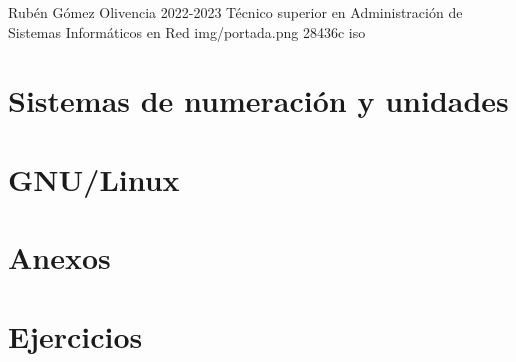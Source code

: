 \documentclass{\ClassPath/yukibook}
\begin{document}
    {Rubén Gómez Olivencia}  %
    {2022-2023}    %
    {Técnico superior en Administración de \linebreak Sistemas Informáticos en Red} %
    {}%
    {}%
    {img/portada.png} %
    {28436c}
    {iso} %

    \coverpage
    \graphicspath{{../../../yukibook.cls/}}
    \licensepage

    \tableofcontents

    \part{Sistemas de numeración y unidades}
    \graphicspath{{../../../temas_comunes/sistemas_de_numeracion/img/}}
    

    \graphicspath{{../../../temas_comunes/unidades_informacion/img/}}
    

    \vfill
    \pagebreak
    \part{GNU/Linux}
    \graphicspath{{../../../temas_comunes/gnu_linux/img}}
    
    
    

    \part{Anexos}

    \graphicspath{{../../../anexos/virtualbox_networking/img}}
    

    \graphicspath{{../../../anexos/instalar_ubuntu_lts/img/}}
    

    \graphicspath{{../../../anexos/gestion_backups/img}}
    

    

    \graphicspath{{../../../anexos/}}
    

    \part{Ejercicios}
    
\end{document}
